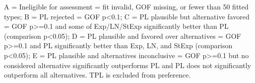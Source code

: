 \begin{flushleft}\footnotesize A = Ineligible for assessment = fit invalid, GOF missing, or fewer than 50 fitted types; B = PL rejected = GOF p<0.1; C = PL plausible but alternative favored = GOF p>=0.1 and some of Exp/LN/StExp significantly better than PL (comparison p<0.05); D = PL plausible and favored over alternatives = GOF p>=0.1 and PL significantly better than Exp, LN, and StExp (comparison p<0.05); E = PL plausible and alternatives inconclusive = GOF p>=0.1 but no considered alternative significantly outperforms PL and PL does not significantly outperform all alternatives. TPL is excluded from preference.\end{flushleft}
